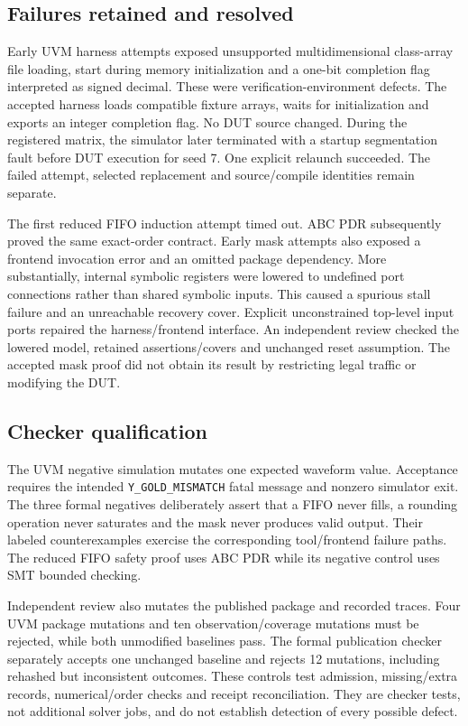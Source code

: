 \subsection{Failures retained and resolved}
Early UVM harness attempts exposed unsupported multidimensional class-array file loading, start during memory initialization and a one-bit completion flag interpreted as signed decimal. These were verification-environment defects. The accepted harness loads compatible fixture arrays, waits for initialization and exports an integer completion flag. No DUT source changed. During the registered matrix, the simulator later terminated with a startup segmentation fault before DUT execution for seed 7. One explicit relaunch succeeded. The failed attempt, selected replacement and source/compile identities remain separate.

The first reduced FIFO induction attempt timed out. ABC PDR subsequently proved the same exact-order contract. Early mask attempts also exposed a frontend invocation error and an omitted package dependency. More substantially, internal symbolic registers were lowered to undefined port connections rather than shared symbolic inputs. This caused a spurious stall failure and an unreachable recovery cover. Explicit unconstrained top-level input ports repaired the harness/frontend interface. An independent review checked the lowered model, retained assertions/covers and unchanged reset assumption. The accepted mask proof did not obtain its result by restricting legal traffic or modifying the DUT.

\subsection{Checker qualification}
The UVM negative simulation mutates one expected waveform value. Acceptance requires the intended \texttt{Y\_GOLD\_MISMATCH} fatal message and nonzero simulator exit. The three formal negatives deliberately assert that a FIFO never fills, a rounding operation never saturates and the mask never produces valid output. Their labeled counterexamples exercise the corresponding tool/frontend failure paths. The reduced FIFO safety proof uses ABC PDR while its negative control uses SMT bounded checking.

Independent review also mutates the published package and recorded traces. Four UVM package mutations and ten observation/coverage mutations must be rejected, while both unmodified baselines pass. The formal publication checker separately accepts one unchanged baseline and rejects 12 mutations, including rehashed but inconsistent outcomes. These controls test admission, missing/extra records, numerical/order checks and receipt reconciliation. They are checker tests, not additional solver jobs, and do not establish detection of every possible defect.
